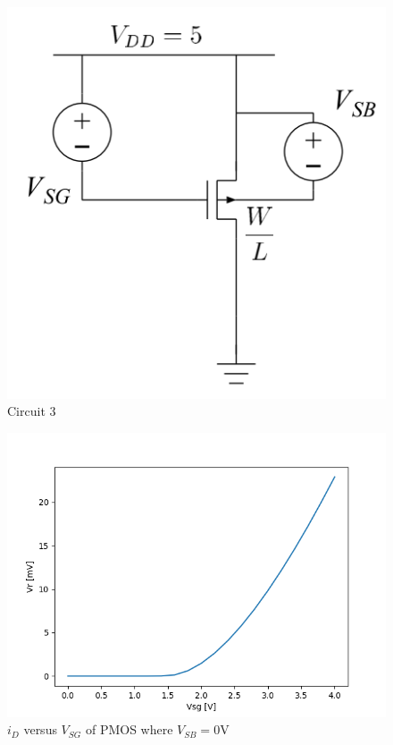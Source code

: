 
\FloatBarrier

\begin{figure}[h!]
	\centering
	\includegraphics[scale=0.75]{../images/circuit_3.PNG}
	\caption{Circuit 3}
	\label{fig:circuit_3}
\end{figure}

\FloatBarrier

\FloatBarrier

\begin{figure}[h!]
	\centering
	\includegraphics[scale=0.75]{../images/data_3.PNG}
	\caption{$i_{D}$ versus $V_{SG}$ of PMOS where $V_{SB}= 0$\si{\volt}}
	\label{fig:data_3}
\end{figure}

